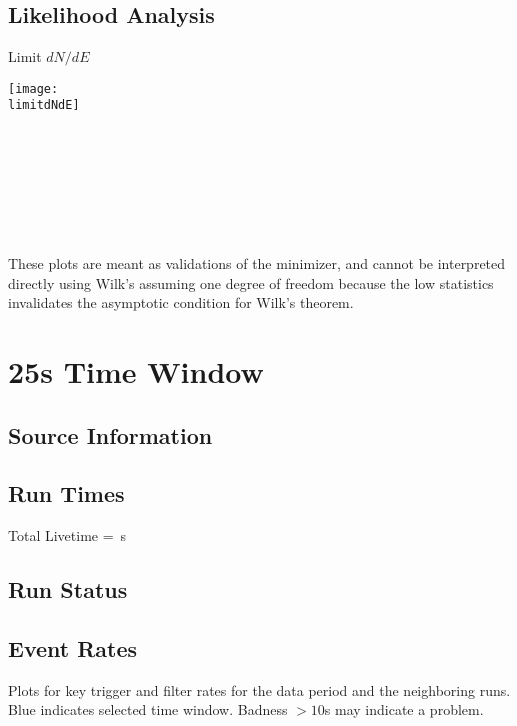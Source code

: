 \documentclass[titlepage]{article}
\begin{document}
\subsection{Likelihood Analysis}
\results
\pagebreak

\backgroundpdfplot

\survivialfunctionplot

\pagebreak
{
  \centering

  {\Large Limit $dN/dE$}

  \texttt{[image: \\limitdNdE]}
  \\
  \\

  \tsd

  \\
  \\
  \upperlim

  \\
  \\
  \nsscan

  These plots are meant as validations of the minimizer, and cannot be interpreted directly using Wilk's assuming one degree of freedom because the low statistics invalidates the asymptotic condition for Wilk's theorem.  
}

\vfill        

\pagebreak
\section{25s Time Window}

\subsection{Source Information}
\sourcetable

\subsection{Run Times}
\runtimetable

Total Livetime = \livetime\,s

\subsection{Run Status}
\runstatustable

\pagebreak
\subsection{Event Rates}
Plots for key trigger and filter rates for the data period
and the neighboring runs.  Blue indicates selected time window.
Badness $>10$s may indicate a problem.
\end{document}
